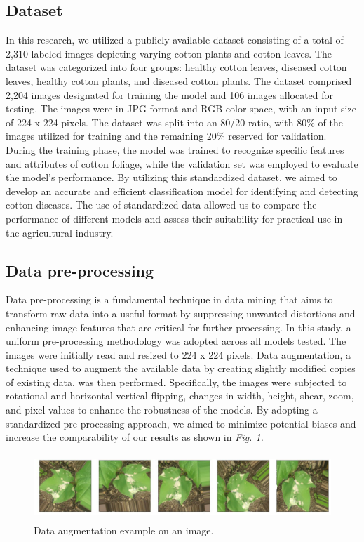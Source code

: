 \documentclass[conference]{IEEEtran}
\begin{document}
\subsection{Dataset}
In this research, we utilized a publicly available dataset consisting of a total of 2,310 labeled images depicting varying cotton plants and cotton leaves. The dataset was categorized into four groups: healthy cotton leaves, diseased cotton leaves, healthy cotton plants, and diseased cotton plants. The dataset comprised 2,204 images designated for training the model and 106 images allocated for testing. The images were in JPG format and RGB color space, with an input size of 224 x 224 pixels. The dataset was split into an 80/20 ratio, with 80\% of the images utilized for training and the remaining 20\% reserved for validation. During the training phase, the model was trained to recognize specific features and attributes of cotton foliage, while the validation set was employed to evaluate the model's performance. By utilizing this standardized dataset, we aimed to develop an accurate and efficient classification model for identifying and detecting cotton diseases. The use of standardized data allowed us to compare the performance of different models and assess their suitability for practical use in the agricultural industry.

\subsection{Data pre-processing}
Data pre-processing is a fundamental technique in data mining that aims to transform raw data into a useful format by suppressing unwanted distortions and enhancing image features that are critical for further processing. In this study, a uniform pre-processing methodology was adopted across all models tested. The images were initially read and resized to 224 x 224 pixels. Data augmentation, a technique used to augment the available data by creating slightly modified copies of existing data, was then performed. Specifically, the images were subjected to rotational and horizontal-vertical flipping, changes in width, height, shear, zoom, and pixel values to enhance the robustness of the models. By adopting a standardized pre-processing approach, we aimed to minimize potential biases and increase the comparability of our results as shown in \emph{Fig. \ref{Augment}.}


\begin{figure}[b]
\centering
\includegraphics[height=2.5cm, width=\linewidth]{Images/Data_Augmentation2_LI (2).pdf}
\caption{Data augmentation example on an image.}
\label{Augment}
\end{figure}
\end{document}
